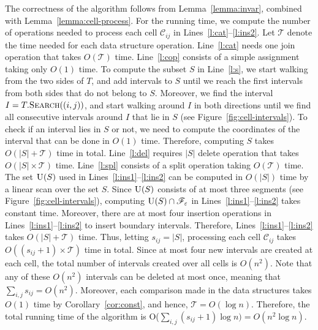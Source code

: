 \documentclass[12pt]{dalthesis}
\def\favoritefont{\bfseries \sffamily}
\def\QED{\ensuremath{{\Box}}}
\def\markatright#1{\leavevmode\unskip\nobreak\quad\hspace*{\fill}{#1}}
\newenvironment{proof}
	{\begin{trivlist}\item[\hskip\labelsep{\favoritefont Proof:}]}
	{\markatright{\QED}\end{trivlist}}
\newcommand{\eps}{\varepsilon}
\newcommand{\CF}{{\mathscr F}}
\newcommand{\CT}{{\mathscr T}}
\newcommand{\CC}{{\mathscr C}}
\newcommand{\cell}[1]{{\CC_{#1}}}
\newcommand{\Feps}{\CF_\eps}
\newcommand{\OP}{\CT}
\newcommand{\union}{\mbox{\sc U}}
\begin{document}
\begin{proof}
	The correctness of the algorithm follows from Lemma~\ref{lemma:invar},
	combined with Lemma~\ref{lemma:cell-process}.
	For the running time, we compute the number of operations
	needed to process each cell $\cell{ij}$ in Lines~\ref{l:cat}--\ref{l:ins2}.
	Let $\OP$ denote the time needed for each data structure operation.
	Line~\ref{l:cat} needs one join operation that takes $O(\OP)$ time.
	Line~\ref{l:cop} consists of a simple assignment taking only $O(1)$ time.
	To compute the subset $S$ in Line~\ref{l:s}, we start walking from 
	the two sides of $T$, and add intervals to $S$ until we reach 
	the first intervals from both sides that do not belong to $S$.
	Moreover, we find the interval $I = T.\mbox{\sc Search}((i,j))$, 
	and start walking around $I$ in both directions until we find all consecutive intervals around $I$ 
	that lie in $S$ (see Figure~\ref{fig:cell-intervals}).
	To check if an interval lies in $S$ or not, we need to compute the coordinates
	of the interval that can be done in $O(1)$ time.
	Therefore, computing $S$ takes $O(|S|+\OP)$ time in total.
	Line~\ref{l:del} requires $|S|$ delete operation that takes $O(|S| \times \OP)$ time.
	Line~\ref{l:spl} consists of a split operation taking $O(\OP)$ time.
	The set $\union(S)$ used in Lines~\ref{l:ins1}--\ref{l:ins2}
	can be computed in $O(|S|)$ time by a linear scan over the set $S$.
	Since $\union(S)$ consists of at most three segments (see Figure~\ref{fig:cell-intervals}),
	computing $\union(S) \cap \Feps$ in Lines~\ref{l:ins1}--\ref{l:ins2} takes constant time.
	Moreover, there are at most four insertion operations in Lines~\ref{l:ins1}--\ref{l:ins2}
	to insert boundary intervals.
	Therefore, Lines~\ref{l:ins1}--\ref{l:ins2} takes $O(|S|+\OP)$  time.
	Thus, letting $s_{ij} = |S|$,
	processing each cell $\cell{ij}$ takes $O((s_{ij}+1) \times \OP)$ time in total.
	Since at most four new intervals are created at each cell,
	the total number of intervals created over all cells is $O(n^2)$.
	Note that any of these $O(n^2)$ intervals can be deleted at most once,
	meaning that $\sum_{i,j} s_{ij} = O(n^2)$. 
	Moreover, 	each comparison made in the data structures 
	takes $O(1)$ time by Corollary~\ref{cor:const},
	and hence, $\OP = O(\log n)$.
	Therefore, the total running time of the algorithm is 
	O($\sum_{i,j} (s_{ij}+1) \log n) = O( n^2 \log n )$.
\end{proof}
\end{document}
